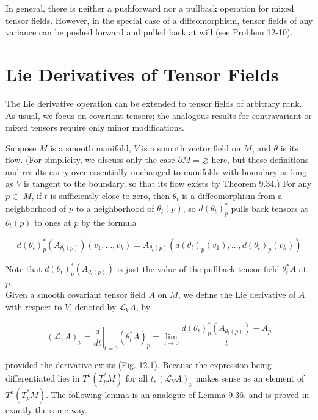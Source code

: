 \documentclass[10pt, letterpaper]{article}
\begin{document}
In general, there is neither a pushforward nor a pullback operation for mixed tensor fields. However, in the special case of a diffeomorphism, tensor fields of any variance can be pushed forward and pulled back at will (see Problem 12-10).

\section*{Lie Derivatives of Tensor Fields}
The Lie derivative operation can be extended to tensor fields of arbitrary rank. As usual, we focus on covariant tensors; the analogous results for contravariant or mixed tensors require only minor modifications.

Suppose $M$ is a smooth manifold, $V$ is a smooth vector field on $M$, and $\theta$ is its flow. (For simplicity, we discuss only the case $\partial M=\varnothing$ here, but these definitions and results carry over essentially unchanged to manifolds with boundary as long as $V$ is tangent to the boundary, so that its flow exists by Theorem 9.34.) For any $p \in$ $M$, if $t$ is sufficiently close to zero, then $\theta_{t}$ is a diffeomorphism from a neighborhood of $p$ to a neighborhood of $\theta_{t}(p)$, so $d\left(\theta_{t}\right)_{p}^{*}$ pulls back tensors at $\theta_{t}(p)$ to ones at $p$ by the formula

$$
d\left(\theta_{t}\right)_{p}^{*}\left(A_{\theta_{t}(p)}\right)\left(v_{1}, \ldots, v_{k}\right)=A_{\theta_{t}(p)}\left(d\left(\theta_{t}\right)_{p}\left(v_{1}\right), \ldots, d\left(\theta_{t}\right)_{p}\left(v_{k}\right)\right)
$$

Note that $d\left(\theta_{t}\right)_{p}^{*}\left(A_{\theta_{t}(p)}\right)$ is just the value of the pullback tensor field $\theta_{t}^{*} A$ at $p$.\\
Given a smooth covariant tensor field $A$ on $M$, we define the Lie derivative of $A$ with respect to $V$, denoted by $\mathscr{L}_{V} A$, by

$$
\left(\mathscr{L}_{V} A\right)_{p}=\left.\frac{d}{d t}\right|_{t=0}\left(\theta_{t}^{*} A\right)_{p}=\lim _{t \rightarrow 0} \frac{d\left(\theta_{t}\right)_{p}^{*}\left(A_{\theta_{t}(p)}\right)-A_{p}}{t}
$$

provided the derivative exists (Fig. 12.1). Because the expression being differentiated lies in $T^{k}\left(T_{p}^{*} M\right)$ for all $t,\left(\mathscr{L}_{V} A\right)_{p}$ makes sense as an element of $T^{k}\left(T_{p}^{*} M\right)$. The following lemma is an analogue of Lemma 9.36, and is proved in exactly the same way.
\end{document}
